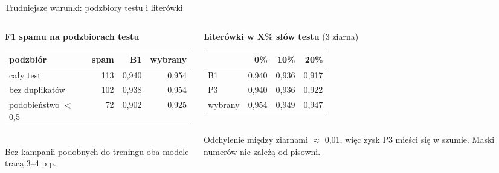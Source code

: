\documentclass[aspectratio=169,10pt]{beamer}
\begin{document}
\begin{frame}{Trudniejsze warunki: podzbiory testu i literówki}
  \begin{columns}[T]
    \begin{column}{0.5\textwidth}
      \textbf{F1 spamu na podzbiorach testu}\\[0.4em]
      \small
      \begin{tabular}{lrrr}
        \toprule
        podzbiór & spam & B1 & wybrany \\
        \midrule
        cały test           & 113 & 0,940 & 0,954 \\
        bez duplikatów      & 102 & 0,938 & 0,954 \\
        podobieństwo $<$ 0,5 &  72 & 0,902 & 0,925 \\
        \bottomrule
      \end{tabular}\\[0.6em]
      Bez kampanii podobnych do treningu oba modele tracą 3--4 p.p.
    \end{column}
    \begin{column}{0.46\textwidth}
      \textbf{Literówki w X\% słów testu} {\small (3 ziarna)}\\[0.4em]
      \small
      \begin{tabular}{lrrr}
        \toprule
        & 0\% & 10\% & 20\% \\
        \midrule
        B1       & 0,940 & 0,936 & 0,917 \\
        P3       & 0,940 & 0,936 & 0,922 \\
        wybrany  & 0,954 & 0,949 & 0,947 \\
        \bottomrule
      \end{tabular}\\[0.6em]
      Odchylenie między ziarnami $\approx$ 0,01, więc zysk P3 mieści się w szumie. Maski numerów nie zależą od pisowni.
    \end{column}
  \end{columns}
\end{frame}
\end{document}

